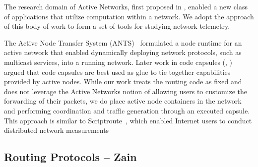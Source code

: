 The research domain of Active Networks, first proposed in
\cite{tennenhouse2002towards}, enabled a new class of applications that utilize
computation within a network. We adopt the approach of this body of work to
form a set of tools for studying network telemetry.

The Active Node Transfer System (ANTS)~\cite{wetherall1998ants} formulated a
node runtime for an active network that enabled dynamically deploying network
protocols, such as multicast services, into a running network. Later work in
code capsules (\cite{tennenhouse1997survey}, \cite{wetherall2002active}) argued
that code capsules are best used as glue to tie together capabilities provided
by active nodes. While our work treats the routing code as fixed and does not
leverage the Active Networks notion of allowing users to customize the
forwarding of their packets, we do place active node containers in the network
and performing coordination and traffic generation through an executed capsule.
This approach is similar to Scriptroute~\cite{spring2003scriptroute}, which
enabled Internet users to conduct distributed network measurements

\subsection{Routing Protocols -- Zain}

